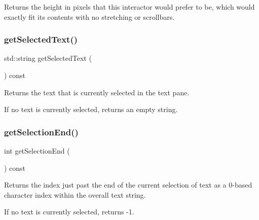 Returns the height in pixels that this interactor would prefer to be, which would exactly fit its contents with no stretching or scrollbars. 

\mbox{\label{classGBrowserPane_a512371b3f41599349f23389825a6ccf7}} 
\subsubsection{\texorpdfstring{get\+Selected\+Text()}{getSelectedText()}}
{\footnotesize\ttfamily std\+::string get\+Selected\+Text (\begin{DoxyParamCaption}{ }\end{DoxyParamCaption}) const\hspace{0.3cm}{\ttfamily [virtual]}}



Returns the text that is currently selected in the text pane. 

If no text is currently selected, returns an empty string. \mbox{\label{classGBrowserPane_a2885313daa0e367cee2ccd0c704a6147}} 
\subsubsection{\texorpdfstring{get\+Selection\+End()}{getSelectionEnd()}}
{\footnotesize\ttfamily int get\+Selection\+End (\begin{DoxyParamCaption}{ }\end{DoxyParamCaption}) const\hspace{0.3cm}{\ttfamily [virtual]}}



Returns the index just past the end of the current selection of text as a 0-\/based character index within the overall text string. 

If no text is currently selected, returns -\/1. \mbox{\label{classGBrowserPane_a68f7816694269b73e6284e756eb0c179}} 
